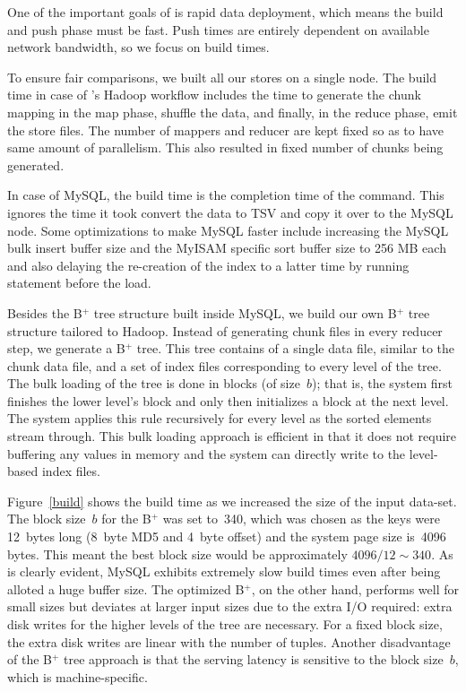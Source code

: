 One of the important goals of \projectname{} is rapid data deployment,
which means the build and push phase must be fast. Push times are
entirely dependent on available network bandwidth, so we focus on
build times.
 
To ensure fair comparisons, we built all our stores on a single node.
The build time in case of \projectname's Hadoop workflow includes the
time to generate the chunk mapping in the map phase, shuffle the data,
and finally, in the reduce phase, emit the store files. The number of
mappers and reducer are kept fixed so as to have same amount of
parallelism. This also resulted in fixed number of chunks being
generated.

In case of MySQL, the build time is the completion time of the
 command. This ignores the time it took convert
the data to TSV and copy it over to the MySQL node. Some optimizations 
to make MySQL faster include increasing the MySQL bulk insert buffer 
size and the MyISAM specific sort buffer size to 256 MB each and also 
delaying the re-creation of the index to a latter time by running 
 statement before the load. 

Besides the B$^{+}$ tree structure built inside MySQL, we build our
own B$^{+}$ tree structure tailored to Hadoop. Instead of generating
chunk files in every reducer step, we generate a B$^{+}$ tree. This
tree contains of a single data file, similar to the chunk data file,
and a set of index files corresponding to every level of the tree. The
bulk loading of the tree is done in blocks (of size~$b$); that is, the
system first finishes the lower level's block and only then
initializes a block at the next level. The system applies this rule
recursively for every level as the sorted elements stream through.
This bulk loading approach is efficient in that it does not require
buffering any values in memory and the system can directly write to
the level-based index files. 

Figure~\ref{build} shows the build time as we increased the size of
the input data-set. The block size~$b$ for the B$^{+}$ was set to~340,
which was chosen as the keys were 12~bytes long (8~byte MD5 and 4~byte
offset) and the system page size is~4096 bytes. This meant the best
block size would be approximately $4096/12 \sim 340$. As is clearly
evident, MySQL exhibits extremely slow build times even after being
alloted a huge buffer size. The optimized B$^{+}$, on the other hand,
performs well for small sizes but deviates at larger input sizes due
to the extra I/O required: extra disk writes for the higher levels of
the tree are necessary. For a fixed block size, the extra disk writes
are linear with the number of tuples.  Another disadvantage of the
B$^{+}$ tree approach is that the serving latency is sensitive to the
block size~$b$, which is machine-specific. 


